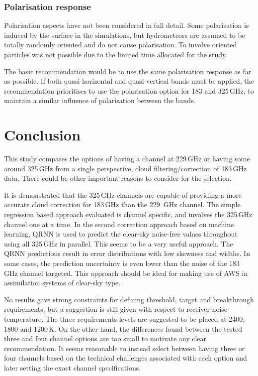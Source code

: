 \documentclass[12pt]{article}
\begin{document}
\subsubsection{Polarisation response}
%
Polarisation aspects have not been considered in full detail. Some polarisation
is induced by the surface in the simulations, but hydrometeors are assumed to
be totally randomly oriented and do not cause polarisation. To involve oriented
particles was not possible due to the limited time allocated for the study.

The basic recommendation would be to use the same polarisation response as far
as possible. If both quasi-horizontal and quasi-vertical bands must be applied,
the recommendation prioritises to use the polarisation option for 183 and
325\,GHz, to maintain a similar influence of polarisation between the bands.

\newpage
\section{Conclusion}
%
This study compares the options of having a channel at 229\,GHz or having some
around 325\,GHz from a single perspective, cloud filtering/correction of
183\,GHz data. There could be other important reasons to consider for the
selection.

It is demonstrated that the 325\,GHz channels are capable of providing a more
accurate cloud correction for 183\,GHz than the 229 \,GHz channel. The simple
regression based approach evaluated is channel specific, and involves the
325\,GHz channel one at a time. In the second correction approach based on
machine learning, QRNN is used to predict the clear-sky noise-free values
throughout using all 325\,GHz in parallel. This seems to be a very useful
approach. The QRNN predictions result in error distributions with low skewness
and widths. In some cases, the prediction uncertainty is even lower than the
noise of the 183\,GHz channel targeted. This approach should be ideal for
making use of AWS in assimilation systems of clear-sky type.

No results gave strong constraints for defining threshold, target and
breakthrough requirements, but a suggestion is still given with respect to
receiver noise temperature. The three requirements levels are suggested to be
placed at 2400, 1800 and 1200\,K. On the other hand, the differences found
between the tested three and four channel options are too small to motivate any
clear recommendation. It seems reasonable to instead select between having
three or four channels based on the technical challenges associated with each
option and later setting the exact channel specifications.


{\footnotesize

}
\end{document}
